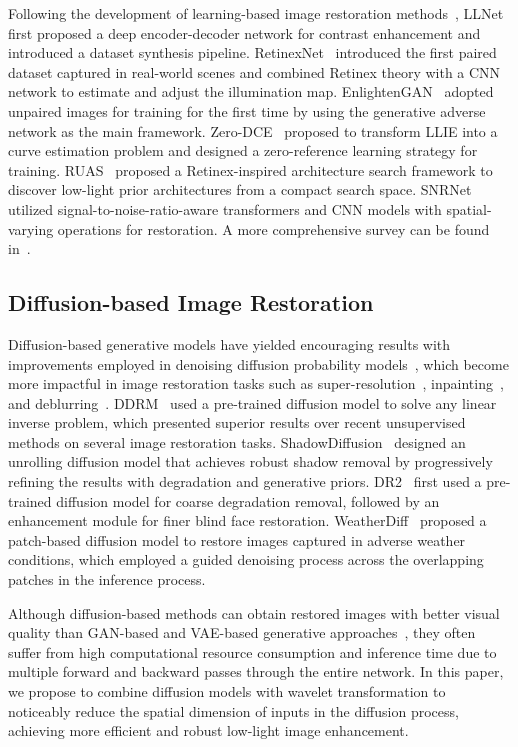 Following the development of learning-based image restoration methods~\cite{restoration1,restoration2,restoration3}, LLNet~\cite{LLNet} first proposed a deep encoder-decoder network for contrast enhancement and introduced a dataset synthesis pipeline. RetinexNet~\cite{RetinexNet} introduced the first paired dataset captured in real-world scenes and combined Retinex theory with a CNN network to estimate and adjust the illumination map. EnlightenGAN~\cite{EnlightenGAN} adopted unpaired images for training for the first time by using the generative adverse network as the main framework. Zero-DCE~\cite{Zero-DCE} proposed to transform LLIE into a curve estimation problem and designed a zero-reference learning strategy for training. RUAS~\cite{RUAS} proposed a Retinex-inspired architecture search framework to discover low-light prior architectures from a compact search space. SNRNet~\cite{SNRNet} utilized signal-to-noise-ratio-aware transformers and CNN models with spatial-varying operations for restoration. A more comprehensive survey can be found in~\cite{survey}.

\subsection{Diffusion-based Image Restoration}
Diffusion-based generative models have yielded encouraging results with improvements employed in denoising diffusion probability models~\cite{ddpm}, which become more impactful in image restoration tasks such as super-resolution~\cite{IR_SDE,ResDiff}, inpainting~\cite{ddpm_inpainting}, and deblurring~\cite{ddpm_deblurring}. DDRM~\cite{ddrm} used a pre-trained diffusion model to solve any linear inverse problem, which presented superior results over recent unsupervised methods on several image restoration tasks. ShadowDiffusion~\cite{shadowdiffusion} designed an unrolling diffusion model that achieves robust shadow removal by progressively refining the results with degradation and generative priors. DR2~\cite{DR2} first used a pre-trained diffusion model for coarse degradation removal, followed by an enhancement module for finer blind face restoration. WeatherDiff~\cite{weatherdiff} proposed a patch-based diffusion model to restore images captured in adverse weather conditions, which employed a guided denoising process across the overlapping patches in the inference process.

Although diffusion-based methods can obtain restored images with better visual quality than GAN-based and VAE-based generative approaches~\cite{gan_face_restoration,VAE_inpainting}, they often suffer from high computational resource consumption and inference time due to multiple forward and backward passes through the entire network. In this paper, we propose to combine diffusion models with wavelet transformation to noticeably reduce the spatial dimension of inputs in the diffusion process, achieving more efficient and robust low-light image enhancement.

